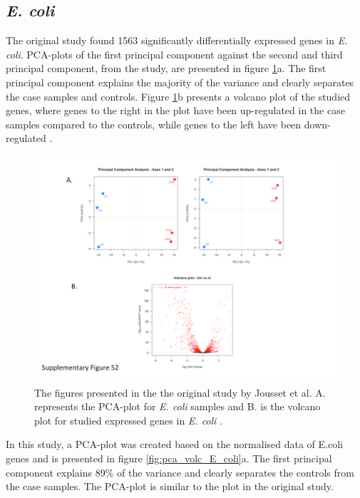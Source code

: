 \subsection{\textit{E. coli}}
The original study found 1563 significantly differentially expressed genes in \textit{E. coli}. PCA-plots of the first principal component against the second and third principal component, from the study, are presented in figure \ref{fig:orig_study_figures}a. The first principal component explains the majority of the variance and clearly separates the case samples and controls. Figure \ref{fig:orig_study_figures}b presents a volcano plot of the studied genes, where genes to the right in the plot have been up-regulated in the case samples compared to the controls, while genes to the left have been down-regulated \cite{jousset2018transcriptional}.

\begin{figure}[h!]
    \centering
    \includegraphics[scale=0.6]{Figures/Orig_study_figures.pdf}
    \caption{The figures presented in the the original study by Jousset et al. A. represents the PCA-plot for \textit{E. coli} samples and B. is the volcano plot for studied expressed genes in \textit{E. coli} \cite{jousset2018transcriptional}.}
    \label{fig:orig_study_figures}
\end{figure}

In this study, a PCA-plot was created based on the normalised data of E.coli genes and is presented in figure \ref{fig:pca_volc_E_coli}a. The first principal component explains 89\% of the variance and clearly separates the controls from the case samples. The PCA-plot is similar to the plot in the original study.


